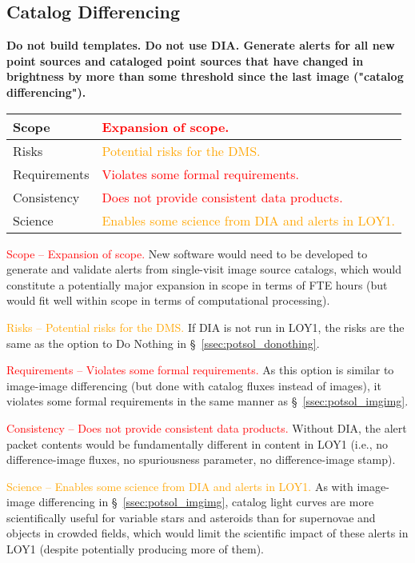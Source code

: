 \documentclass[DM,toc]{lsstdoc}
\begin{document}
\clearpage
\subsection{Catalog Differencing}\label{ssec:potsol_catdiff}

{\bf Do not build templates. Do not use DIA. Generate alerts for all new point sources and cataloged point sources that have changed in brightness by more than some threshold since the last image ("catalog differencing").}

\begin{center}
\begin{tabular}{|p{2.5cm}|p{13cm}|}
\hline
Scope & \textcolor{red}{Expansion of scope.}  \\
\hline
Risks & \textcolor{orange}{Potential risks for the DMS.} \\
\hline
Requirements & \textcolor{red}{Violates some formal requirements.} \\
\hline
Consistency & \textcolor{red}{Does not provide consistent data products.} \\
\hline
Science & \textcolor{orange}{Enables some science from DIA and alerts in LOY1.} \\
\hline
\end{tabular}
\end{center}

\textcolor{red}{Scope -- Expansion of scope.}
New software would need to be developed to generate and validate alerts from single-visit image source catalogs, which would constitute a potentially major expansion in scope in terms of FTE hours (but would fit well within scope in terms of computational processing).

\textcolor{orange}{Risks -- Potential risks for the DMS.}
If DIA is not run in LOY1, the risks are the same as the option to Do Nothing in \S~\ref{ssec:potsol_donothing}. 

\textcolor{red}{Requirements -- Violates some formal requirements.}
As this option is similar to image-image differencing (but done with catalog fluxes instead of images), it violates some formal requirements in the same manner as \S~\ref{ssec:potsol_imgimg}. 

\textcolor{red}{Consistency -- Does not provide consistent data products.}
Without DIA, the alert packet contents would be fundamentally different in content in LOY1 (i.e., no difference-image fluxes, no spuriousness parameter, no difference-image stamp).

\textcolor{orange}{Science -- Enables some science from DIA and alerts in LOY1.}
As with image-image differencing in \S~\ref{ssec:potsol_imgimg}, catalog light curves are more scientifically useful for variable stars and asteroids than for supernovae and objects in crowded fields, which would limit the scientific impact of these alerts in LOY1 (despite potentially producing more of them).
\end{document}
